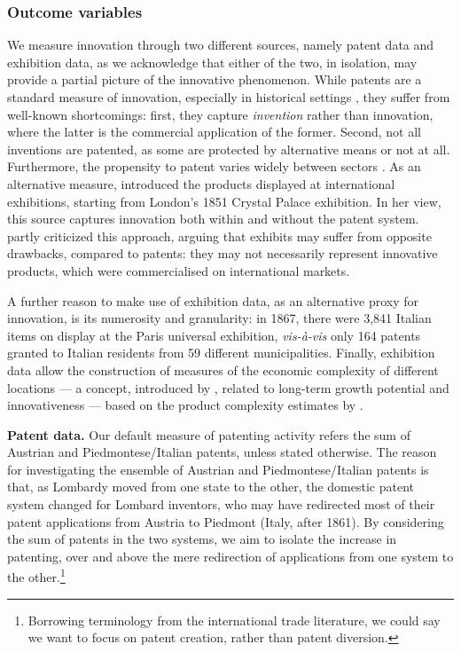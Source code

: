 \subsubsection{Outcome variables} 
We measure innovation through two different sources, namely patent data and exhibition data, as we acknowledge that either of the two, in isolation, may provide a partial picture of the innovative phenomenon. 
While patents are a standard measure of innovation, especially in historical settings \citep{streb2023}, they suffer from well-known shortcomings: first, they capture \textit{invention} rather than innovation, where the latter is the commercial application of the former. 
Second, not all inventions are patented, as some are protected by alternative means or not at all. 
Furthermore, the propensity to patent varies widely between sectors \citep{griliches1990, nagaoka2010}. 
As an alternative measure, \citet{moser2005} introduced the products displayed at international exhibitions, starting from London's 1851 Crystal Palace exhibition. 
In her view, this source captures innovation both within and without the patent system. 
\citet{domini2019} partly criticized this approach, arguing that exhibits may suffer from opposite drawbacks, compared to patents: they may not necessarily represent innovative products, which were commercialised on international markets. 

A further reason to make use of exhibition data, as an alternative proxy for innovation, is its numerosity and granularity: in 1867, there were 3,841 Italian items on display at the Paris universal exhibition, \textit{vis-à-vis} only 164 patents granted to Italian residents from 59 different municipalities. 
Finally, exhibition data allow the construction of measures of the economic complexity of different locations --- a concept, introduced by \citet{hidalgo2009}, related to long-term growth potential and innovativeness \citep[see][for a review]{hidalgo2021} --- based on the product complexity estimates by \cite{domini2022}.

\smallskip
\noindent \textbf{Patent data.} 
Our default measure of patenting activity refers the sum of Austrian and Piedmontese/Italian patents, unless stated otherwise. 
The reason for investigating the ensemble of Austrian and Piedmontese/Italian patents is that, as Lombardy moved from one state to the other, the domestic patent system changed for Lombard inventors, who may have redirected most of their patent applications from Austria to Piedmont (Italy, after 1861). 
By considering the sum of patents in the two systems, we aim to isolate the increase in patenting, over and above the mere redirection of applications from one system to the other.\footnote{Borrowing terminology from the international trade literature, we could say we want to focus on patent creation, rather than patent diversion.}

